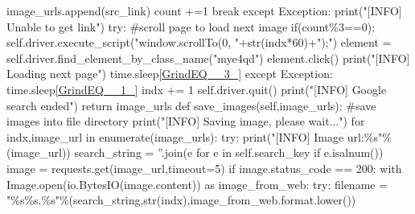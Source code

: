 \documentclass[10pt]{article} %
\begin{document}
\begin{spacing}{1.5}
image\_urls.append(src\_link)  \newline
count +=1 \newline
break   \newline
except Exception: \newline
print("[INFO] Unable to get link")      \newline
try:            \newline
\#scroll page to load next image        \newline
if(count\%3==0):    \newline
self.driver.execute\_script("window.scrollTo(0, "+str(indx*60)+");")        \newline
element = self.driver.find\_element\_by\_class\_name("mye4qd")               \newline
element.click()    \newline
print("[INFO] Loading next page")            \newline
time.sleep\eqref{GrindEQ__3_}       \newline
except Exception:      \newline
time.sleep\eqref{GrindEQ__1_}            indx += 1      \newline
self.driver.quit()  \newline
print("[INFO] Google search ended")   \newline   
return image\_urls  \newline
def save\_images(self,image\_urls):      \newline
\#save images into file directory\textit{        }\newline 
print("[INFO] Saving image, please wait...")    \newline
for indx,image\_url in enumerate(image\_urls):      \newline
try:    \newline
print("[INFO] Image url:\%s"\%(image\_url))     \newline
search\_string = ''.join(e for e in self.search\_key if e.isalnum())\newline
image = requests.get(image\_url,timeout=5)      \newline
if image.status\_code == 200:       \newline
with Image.open(io.BytesIO(image.content)) as image\_from\_web: \newline
try:        \newline
filename = "\%s\%s.\%s"\%(search\_string,str(indx),image\_from\_web.format.lower()) \newline

\end{spacing}
\end{document}

